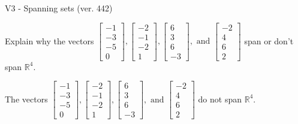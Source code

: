 \begin{exercise}
  \begin{exerciseTitle}V3 - Spanning sets (ver. 442)\end{exerciseTitle}
  \begin{exerciseStatement}
    Explain why the vectors \(\left[\begin{array}{r}
-1 \\
-3 \\
-5 \\
0
\end{array}\right] , \left[\begin{array}{r}
-2 \\
-1 \\
-2 \\
1
\end{array}\right] , \left[\begin{array}{r}
6 \\
3 \\
6 \\
-3
\end{array}\right] , \text{ and } \left[\begin{array}{r}
-2 \\
4 \\
6 \\
2
\end{array}\right]\) span or don't span \(\mathbb{R}^4\). 
	


  \end{exerciseStatement}
  \begin{exerciseAnswer}
   The vectors \(\left[\begin{array}{r}
-1 \\
-3 \\
-5 \\
0
\end{array}\right] , \left[\begin{array}{r}
-2 \\
-1 \\
-2 \\
1
\end{array}\right] , \left[\begin{array}{r}
6 \\
3 \\
6 \\
-3
\end{array}\right] , \text{ and } \left[\begin{array}{r}
-2 \\
4 \\
6 \\
2
\end{array}\right]\) 
  	 do not  
	span \(\mathbb{R}^4\).
  


  \end{exerciseAnswer}
\end{exercise}